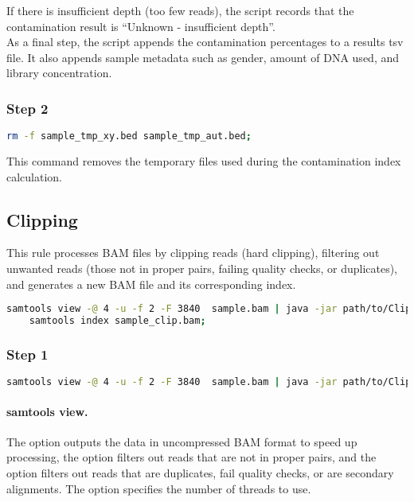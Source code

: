 If there is insufficient depth (too few reads), the script records that the contamination result is “Unknown - insufficient depth”.\\

As a final step, the script appends the contamination percentages to a results tsv file. It also appends sample metadata such as gender, amount of DNA used, and library concentration.

\subsubsection*{Step 2}

\begin{lstlisting}[breaklines=true, language=bash]
    rm -f sample_tmp_xy.bed sample_tmp_aut.bed;
\end{lstlisting}

This command removes the temporary files used during the contamination index calculation.

\subsection{Clipping}

This rule processes BAM files by clipping reads (hard clipping), filtering out unwanted reads (those not in proper pairs, failing quality checks, or duplicates), and generates a new BAM file and its corresponding index.

\begin{lstlisting}[breaklines=true, language=bash]
    samtools view -@ 4 -u -f 2 -F 3840  sample.bam | java -jar path/to/ClipBamOverlap.jar --fasta REF --clipMode HARD --coordSort --output sample_clip.bam;
    samtools index sample_clip.bam;
\end{lstlisting}

\subsubsection*{Step 1}

\begin{lstlisting}[breaklines=true, language=bash]
    samtools view -@ 4 -u -f 2 -F 3840  sample.bam | java -jar path/to/ClipBamOverlap.jar --fasta REF --clipMode HARD --coordSort --output sample_clip.bam
\end{lstlisting}

\paragraph*{samtools view.} The option  outputs the data in uncompressed BAM format to speed up processing, the option  filters out reads that are not in proper pairs, and the option  filters out reads that are duplicates, fail quality checks, or are secondary alignments. The option  specifies the number of threads to use.

